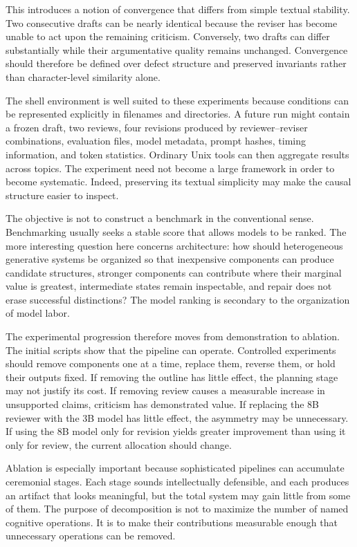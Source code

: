 \documentclass[11pt]{article}
\begin{document}
This introduces a notion of convergence that differs from simple textual stability. Two consecutive drafts can be nearly identical because the reviser has become unable to act upon the remaining criticism. Conversely, two drafts can differ substantially while their argumentative quality remains unchanged. Convergence should therefore be defined over defect structure and preserved invariants rather than character-level similarity alone.

The shell environment is well suited to these experiments because conditions can be represented explicitly in filenames and directories. A future run might contain a frozen draft, two reviews, four revisions produced by reviewer--reviser combinations, evaluation files, model metadata, prompt hashes, timing information, and token statistics. Ordinary Unix tools can then aggregate results across topics. The experiment need not become a large framework in order to become systematic. Indeed, preserving its textual simplicity may make the causal structure easier to inspect.

The objective is not to construct a benchmark in the conventional sense. Benchmarking usually seeks a stable score that allows models to be ranked. The more interesting question here concerns architecture: how should heterogeneous generative systems be organized so that inexpensive components can produce candidate structures, stronger components can contribute where their marginal value is greatest, intermediate states remain inspectable, and repair does not erase successful distinctions? The model ranking is secondary to the organization of model labor.

The experimental progression therefore moves from demonstration to ablation. The initial scripts show that the pipeline can operate. Controlled experiments should remove components one at a time, replace them, reverse them, or hold their outputs fixed. If removing the outline has little effect, the planning stage may not justify its cost. If removing review causes a measurable increase in unsupported claims, criticism has demonstrated value. If replacing the 8B reviewer with the 3B model has little effect, the asymmetry may be unnecessary. If using the 8B model only for revision yields greater improvement than using it only for review, the current allocation should change.

Ablation is especially important because sophisticated pipelines can accumulate ceremonial stages. Each stage sounds intellectually defensible, and each produces an artifact that looks meaningful, but the total system may gain little from some of them. The purpose of decomposition is not to maximize the number of named cognitive operations. It is to make their contributions measurable enough that unnecessary operations can be removed.
\end{document}

